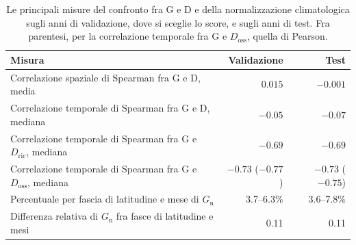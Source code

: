 \begin{table}[htbp]
    \centering
    \footnotesize
    \caption{Le principali misure del confronto fra G e D e della normalizzazione climatologica sugli anni di validazione, dove si sceglie lo score, e sugli anni di test. Fra parentesi, per la correlazione temporale fra G e $D_{\mathrm{oss}}$, quella di Pearson.}
    \label{tab:ris-conferma-test}
    \vspace{0.6em}
    \begin{tabular}{@{}L{0.56}rr@{}}
        \toprule
        Misura & Validazione & Test \\
        \midrule
        Correlazione spaziale di Spearman fra G e D, media & $0.015$ & $-0.001$ \\
        Correlazione temporale di Spearman fra G e D, mediana & $-0.05$ & $-0.07$ \\
        Correlazione temporale di Spearman fra G e $D_{\mathrm{ric}}$, mediana & $-0.69$ & $-0.69$ \\
        Correlazione temporale di Spearman fra G e $D_{\mathrm{oss}}$, mediana & $-0.73$ ($-0.77$) & $-0.73$ ($-0.75$) \\
        \addlinespace
        Percentuale per fascia di latitudine e mese di $G_{\mathrm{n}}$ & 3.7--6.3\% & 3.6--7.8\% \\
        Differenza relativa di $G_{\mathrm{n}}$ fra fasce di latitudine e mesi & 0.11 & 0.11 \\
        \bottomrule
    \end{tabular}
\end{table}

